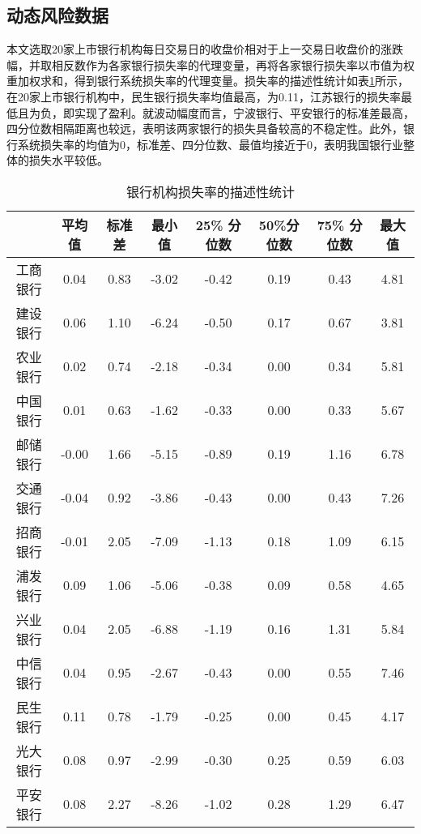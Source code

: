 \documentclass[lang=cn]{elegantpaper}
\begin{document}
\subsection{动态风险数据}
本文选取20家上市银行机构每日交易日的收盘价相对于上一交易日收盘价的涨跌幅，并取相反数作为各家银行损失率的代理变量，再将各家银行损失率以市值为权重加权求和，得到银行系统损失率的代理变量。损失率的描述性统计如表\ref{表5}所示，在20家上市银行机构中，民生银行损失率均值最高，为0.11，江苏银行的损失率最低且为负，即实现了盈利。就波动幅度而言，宁波银行、平安银行的标准差最高，四分位数相隔距离也较远，表明该两家银行的损失具备较高的不稳定性。此外，银行系统损失率的均值为0，标准差、四分位数、最值均接近于0，表明我国银行业整体的损失水平较低。

\setlength{\tabcolsep}{9.7pt}
\begin{longtable}{cccccccc}
    \caption{银行机构损失率的描述性统计}
    \label{表5}\\
    \toprule
         & 平均值   & 标准差  & 最小值    & 25\% 分位数 & 50\%分位数 & 75\% 分位数 & 最大值  \\ \midrule
    \endhead
    \bottomrule
    \endfoot
    \endlastfoot
    工商银行 & 0.04  & 0.83 & -3.02  & -0.42    & 0.19    & 0.43     & 4.81 \\
    建设银行 & 0.06  & 1.10 & -6.24  & -0.50    & 0.17    & 0.67     & 3.81 \\
    农业银行 & 0.02  & 0.74 & -2.18  & -0.34    & 0.00    & 0.34     & 5.81 \\
    中国银行 & 0.01  & 0.63 & -1.62  & -0.33    & 0.00    & 0.33     & 5.67 \\
    邮储银行 & -0.00 & 1.66 & -5.15  & -0.89    & 0.19    & 1.16     & 6.78 \\
    交通银行 & -0.04 & 0.92 & -3.86  & -0.43    & 0.00    & 0.43     & 7.26 \\
    招商银行 & -0.01 & 2.05 & -7.09  & -1.13    & 0.18    & 1.09     & 6.15 \\
    浦发银行 & 0.09  & 1.06 & -5.06  & -0.38    & 0.09    & 0.58     & 4.65 \\
    兴业银行 & 0.04  & 2.05 & -6.88  & -1.19    & 0.16    & 1.31     & 5.84 \\
    中信银行 & 0.04  & 0.95 & -2.67  & -0.43    & 0.00    & 0.55     & 7.46 \\
    民生银行 & 0.11  & 0.78 & -1.79  & -0.25    & 0.00    & 0.45     & 4.17 \\
    光大银行 & 0.08  & 0.97 & -2.99  & -0.30    & 0.25    & 0.59     & 6.03 \\
    平安银行 & 0.08  & 2.27 & -8.26  & -1.02    & 0.28    & 1.29     & 6.47 \\

\end{longtable}
\end{document}
